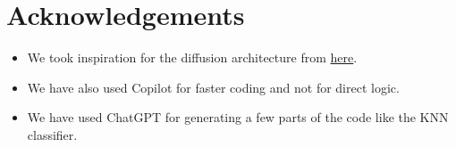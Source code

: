 \documentclass[11pt]{article}
\begin{document}
\section*{Acknowledgements}

\begin{itemize}
    \item We took inspiration for the diffusion architecture from \href{https://github.com/albarji/toy-diffusion/blob/master/swissRoll.ipynb}{here}.
    \item We have also used Copilot for faster coding and not for direct logic.
    \item We have used ChatGPT for generating a few parts of the code like the KNN classifier.
\end{itemize}
\end{document}
